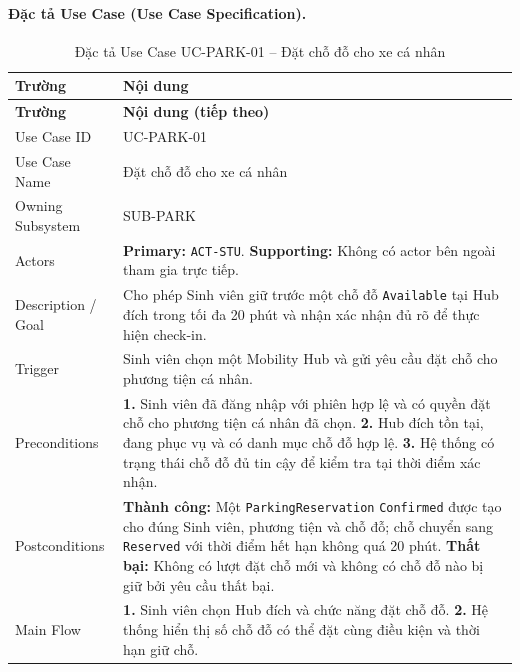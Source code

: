 \paragraph{Đặc tả Use Case (Use Case Specification).}
\small
\begin{longtable}{|L{42mm}|L{102mm}|}
  \caption{Đặc tả Use Case UC-PARK-01 -- Đặt chỗ đỗ cho xe cá nhân}\label{tab:spec-UC-PARK-01}\\
  \hline
  \centering\arraybackslash\textbf{Trường} & \centering\arraybackslash\textbf{Nội dung}\\
  \hline
  \endfirsthead
  \hline
  \centering\arraybackslash\textbf{Trường} & \centering\arraybackslash\textbf{Nội dung (tiếp theo)}\\
  \hline
  \endhead
  Use Case ID & UC-PARK-01\\\hline
  Use Case Name & Đặt chỗ đỗ cho xe cá nhân\\\hline
  Owning Subsystem & SUB-PARK\\\hline
  Actors & \textbf{Primary:} \texttt{ACT-STU}. \textbf{Supporting:} Không có actor bên ngoài tham gia trực tiếp.\\\hline
  Description / Goal & Cho phép Sinh viên giữ trước một chỗ đỗ \texttt{Available} tại Hub đích trong tối đa 20 phút và nhận xác nhận đủ rõ để thực hiện check-in.\\\hline
  Trigger & Sinh viên chọn một Mobility Hub và gửi yêu cầu đặt chỗ cho phương tiện cá nhân.\\\hline
  Preconditions &
    \textbf{1.} Sinh viên đã đăng nhập với phiên hợp lệ và có quyền đặt chỗ cho phương tiện cá nhân đã chọn.\newline
    \textbf{2.} Hub đích tồn tại, đang phục vụ và có danh mục chỗ đỗ hợp lệ.\newline
    \textbf{3.} Hệ thống có trạng thái chỗ đỗ đủ tin cậy để kiểm tra tại thời điểm xác nhận.\\\hline
  Postconditions &
    \textbf{Thành công:} Một \texttt{ParkingReservation} \texttt{Confirmed} được tạo cho đúng Sinh viên, phương tiện và chỗ đỗ; chỗ chuyển sang \texttt{Reserved} với thời điểm hết hạn không quá 20 phút.\newline
    \textbf{Thất bại:} Không có lượt đặt chỗ mới và không có chỗ đỗ nào bị giữ bởi yêu cầu thất bại.\\\hline
  Main Flow &
    \textbf{1.} Sinh viên chọn Hub đích và chức năng đặt chỗ đỗ.\newline
    \textbf{2.} Hệ thống hiển thị số chỗ đỗ có thể đặt cùng điều kiện và thời hạn giữ chỗ.\newline

\end{longtable}
